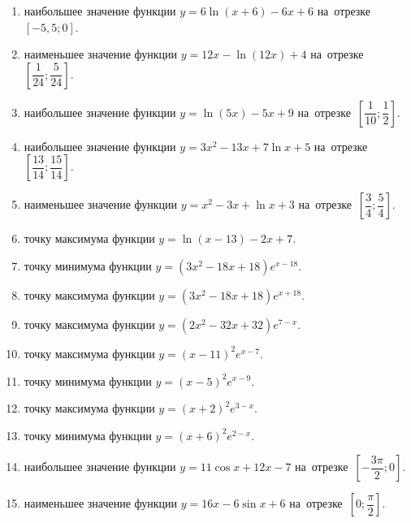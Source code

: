 \documentclass[a4paper,10pt]{article}
\begin{document}
\begin{enumerate}
\item {} наибольшее значение функции $y=6\ln \left(x+6\right)-6x+6$ на~отрезке~$\left[-5,5;0\right]$.

\item {} наименьшее значение функции $y=12x-\ln \left(12x\right)+4$ на~отрезке~$\left[\dfrac{1}{24};\dfrac{5}{24}\right]$.

\item {} наибольшее значение функции $y=\ln \left(5x\right)-5x+9$ на~отрезке~$\left[\dfrac{1}{10};\dfrac{1}{2}\right]$.

\item {} наибольшее значение функции $y=3x^2-13x+7\ln x+5$ на~отрезке~$\left[\dfrac{13}{14};\dfrac{15}{14}\right]$.

\item {} наименьшее значение функции $y=x^2-3x+\ln x+3$ на~отрезке~$\left[\dfrac{3}{4};\dfrac{5}{4}\right]$.

\item {} точку максимума функции $y=\ln \left(x-13\right)-2x+7$.

\item {} точку минимума функции $y=\left(3x^2-18x+18\right)e^{x-18}$.

\item {} точку максимума функции $y=\left(3x^2-18x+18\right)e^{x+18}$.

\item {} точку максимума функции $y=\left(2x^2-32x+32\right)e^{7-x}$.

\item {} точку максимума функции $y=\left(x-11\right)^2e^{x-7}$.

\item {} точку минимума функции $y=\left(x-5\right)^2e^{x-9}$.

\item {} точку максимума функции $y=\left(x+2\right)^2e^{3-x}$.

\item {} точку минимума функции $y=\left(x+6\right)^2e^{2-x}$.

\item {} наибольшее значение функции $y=11\cos x+12x-7$ на~отрезке~$\left[-\dfrac{3\pi }{2};0\right]$.

\item {} наименьшее значение функции $y=16x-6\sin x+6$ на~отрезке~$\left[0;\dfrac{\pi }{2}\right]$.


\end{enumerate}
\end{document}
